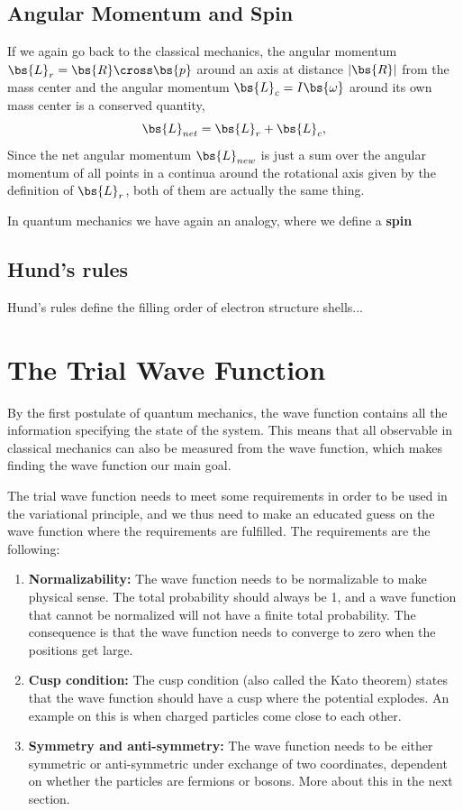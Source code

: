 \subsection{Angular Momentum and Spin}
If we again go back to the classical mechanics, the angular momentum $\bs{L}_r=\bs{R}\cross\bs{p}$ around an axis at distance $|\bs{R}|$ from the mass center and the angular momentum $\bs{L}_c=I\bs{\omega}$ around its own mass center is a conserved quantity,
\begin{equation}
\bs{L}_{net} = \bs{L}_r+\bs{L}_c,
\end{equation}
Since the net angular momentum $\bs{L}_{new}$ is just a sum over the angular momentum of all points in a continua around the rotational axis given by the definition of $\bs{L}_r$, both of them are actually the same thing.

In quantum mechanics we have again an analogy, where we define a \textbf{spin} 

\subsection{Hund's rules}
Hund's rules define the filling order of electron structure shells...

\section{The Trial Wave Function} \label{subsec:wavefunction}
By the first postulate of quantum mechanics, the wave function contains all the information specifying the state of the system. This means that all observable in classical mechanics can also be measured from the wave function, which makes finding the wave function our main goal.

The trial wave function needs to meet some requirements in order to be used in the variational principle, and we thus need to make an educated guess on the wave function where the requirements are fulfilled. The requirements are the following:

\begin{enumerate}
	\item \textbf{Normalizability:} The wave function needs to be normalizable to make physical sense. The total probability should always be 1, and a wave function that cannot be normalized will not have a finite total probability. The consequence is that the wave function needs to converge to zero when the positions get large. 
	
	\item \textbf{Cusp condition:} The cusp condition (also called the Kato theorem) states that the wave function should have a cusp where the potential explodes. An example on this is when charged particles come close to each other. 
	
	\item \textbf{Symmetry and anti-symmetry:} The wave function needs to be either symmetric or anti-symmetric under exchange of two coordinates, dependent on whether the particles are fermions or bosons. More about this in the next section.
\end{enumerate}

